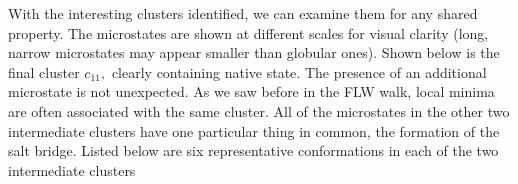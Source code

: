 With the interesting clusters identified, we can examine them for any shared property. The microstates are shown at different scales for visual clarity (long, narrow microstates may appear smaller than globular ones). Shown below is the final cluster $c_{11},$ clearly containing native state.
The presence of an additional microstate is not unexpected. As we saw before in the FLW walk, local minima are often associated with the same cluster.
All of the microstates in the other two intermediate clusters have one particular thing in common, the formation of the salt bridge. Listed below are six representative conformations in each of the two intermediate clusters
%

